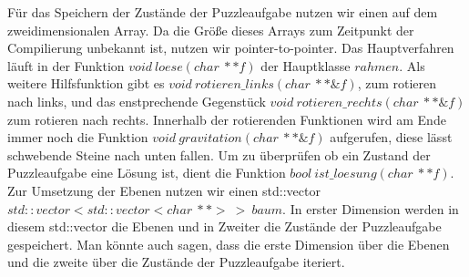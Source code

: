 	Für das Speichern der Zustände der Puzzleaufgabe nutzen wir einen auf dem zweidimensionalen Array. 
	Da die Größe dieses Arrays zum Zeitpunkt der Compilierung unbekannt ist, nutzen wir pointer-to-pointer.
	Das Hauptverfahren läuft in der Funktion \(void\ loese(char\ **f)\) der Hauptklasse \(rahmen\).
  Als weitere Hilfsfunktion gibt es \(void\ rotieren\_links(char\ **\&f)\), zum rotieren nach links, 
	und das enstprechende Gegenstück \(void\ rotieren\_rechts(char\ **\&f)\) zum rotieren nach rechts.
	Innerhalb der rotierenden Funktionen wird am Ende immer noch die Funktion \(void\ gravitation(char\ **\&f)\) aufgerufen,
	diese lässt schwebende Steine nach unten fallen. Um zu überprüfen ob ein Zustand der Puzzleaufgabe eine Lösung ist, 
	dient die Funktion \(bool\ ist\_loesung(char\ **f)\).
	Zur Umsetzung der Ebenen nutzen wir einen std::vector \(std::vector<std::vector<char\ **>\ >\ baum\).
	In erster Dimension werden in diesem std::vector die Ebenen und in Zweiter die Zustände der Puzzleaufgabe gespeichert. 
	Man könnte auch sagen, dass die erste Dimension über die Ebenen und die zweite über die Zustände der Puzzleaufgabe iteriert.
	
	
